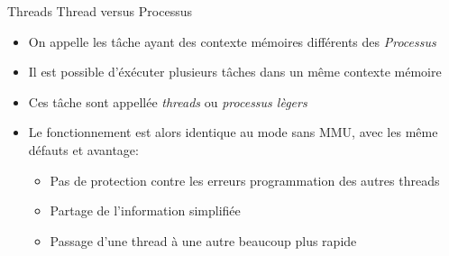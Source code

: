 \begin{frame}{Threads}
  Thread versus Processus
  \begin{itemize}
  \item On  appelle les tâche  ayant des contexte  mémoires différents
    des \emph{Processus}
  \item  Il est  possible  d'éxécuter plusieurs  tâches  dans un  même
    contexte mémoire
  \item  Ces  tâche sont  appellée  \emph{threads} ou  \emph{processus
      lègers}
  \item Le fonctionnement  est alors identique au mode  sans MMU, avec
    les même défauts et avantage:
    \begin{itemize}
    \item  Pas  de protection  contre  les  erreurs programmation  des
      autres threads
    \item Partage de l'information simplifiée
    \item Passage d'une thread à une autre beaucoup plus rapide
    \end{itemize}
  \end{itemize}
\end{frame} 







